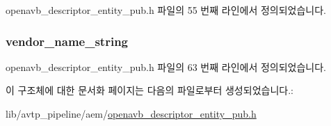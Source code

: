 openavb\+\_\+descriptor\+\_\+entity\+\_\+pub.\+h 파일의 55 번째 라인에서 정의되었습니다.

\subsubsection[{\texorpdfstring{vendor\+\_\+name\+\_\+string}{vendor_name_string}}]{ vendor\+\_\+name\+\_\+string}\hypertarget{structopenavb__aem__descriptor__entity__t_a91e94d6f4936e3c826dc9ce99bc66fc9}{}\label{structopenavb__aem__descriptor__entity__t_a91e94d6f4936e3c826dc9ce99bc66fc9}


openavb\+\_\+descriptor\+\_\+entity\+\_\+pub.\+h 파일의 63 번째 라인에서 정의되었습니다.



이 구조체에 대한 문서화 페이지는 다음의 파일로부터 생성되었습니다.\+:\begin{DoxyCompactItemize}
\item 
lib/avtp\+\_\+pipeline/aem/\hyperlink{openavb__descriptor__entity__pub_8h}{openavb\+\_\+descriptor\+\_\+entity\+\_\+pub.\+h}\end{DoxyCompactItemize}
